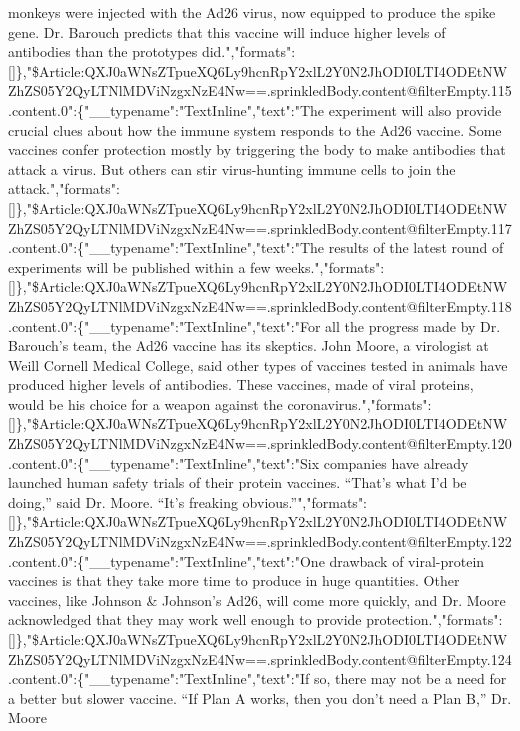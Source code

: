 monkeys were injected with the Ad26 virus, now equipped to produce the
spike gene. Dr. Barouch predicts that this vaccine will induce higher
levels of antibodies than the prototypes
did.","formats":{[}{]}\},"\$Article:QXJ0aWNsZTpueXQ6Ly9hcnRpY2xlL2Y0N2JhODI0LTI4ODEtNWZhZS05Y2QyLTNlMDViNzgxNzE4Nw==.sprinkledBody.content@filterEmpty.115.content.0":\{"\_\_typename":"TextInline","text":"The
experiment will also provide crucial clues about how the immune system
responds to the Ad26 vaccine. Some vaccines confer protection mostly by
triggering the body to make antibodies that attack a virus. But others
can stir virus-hunting immune cells to join the
attack.","formats":{[}{]}\},"\$Article:QXJ0aWNsZTpueXQ6Ly9hcnRpY2xlL2Y0N2JhODI0LTI4ODEtNWZhZS05Y2QyLTNlMDViNzgxNzE4Nw==.sprinkledBody.content@filterEmpty.117.content.0":\{"\_\_typename":"TextInline","text":"The
results of the latest round of experiments will be published within a
few
weeks.","formats":{[}{]}\},"\$Article:QXJ0aWNsZTpueXQ6Ly9hcnRpY2xlL2Y0N2JhODI0LTI4ODEtNWZhZS05Y2QyLTNlMDViNzgxNzE4Nw==.sprinkledBody.content@filterEmpty.118.content.0":\{"\_\_typename":"TextInline","text":"For
all the progress made by Dr. Barouch's team, the Ad26 vaccine has its
skeptics. John Moore, a virologist at Weill Cornell Medical College,
said other types of vaccines tested in animals have produced higher
levels of antibodies. These vaccines, made of viral proteins, would be
his choice for a weapon against the
coronavirus.","formats":{[}{]}\},"\$Article:QXJ0aWNsZTpueXQ6Ly9hcnRpY2xlL2Y0N2JhODI0LTI4ODEtNWZhZS05Y2QyLTNlMDViNzgxNzE4Nw==.sprinkledBody.content@filterEmpty.120.content.0":\{"\_\_typename":"TextInline","text":"Six
companies have already launched human safety trials of their protein
vaccines. ``That's what I'd be doing,'' said Dr. Moore. ``It's freaking
obvious.''","formats":{[}{]}\},"\$Article:QXJ0aWNsZTpueXQ6Ly9hcnRpY2xlL2Y0N2JhODI0LTI4ODEtNWZhZS05Y2QyLTNlMDViNzgxNzE4Nw==.sprinkledBody.content@filterEmpty.122.content.0":\{"\_\_typename":"TextInline","text":"One
drawback of viral-protein vaccines is that they take more time to
produce in huge quantities. Other vaccines, like Johnson \& Johnson's
Ad26, will come more quickly, and Dr. Moore acknowledged that they may
work well enough to provide
protection.","formats":{[}{]}\},"\$Article:QXJ0aWNsZTpueXQ6Ly9hcnRpY2xlL2Y0N2JhODI0LTI4ODEtNWZhZS05Y2QyLTNlMDViNzgxNzE4Nw==.sprinkledBody.content@filterEmpty.124.content.0":\{"\_\_typename":"TextInline","text":"If
so, there may not be a need for a better but slower vaccine. ``If Plan A
works, then you don't need a Plan B,'' Dr. Moore

